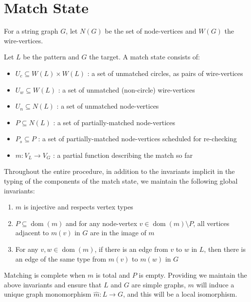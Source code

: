 \documentclass{article}
\DeclareMathOperator{\dom}{dom}
\begin{document}
\section{Match State}
\label{sec:match-state}

For a string graph $G$, let $N(G)$ be the set of node-vertices and $W(G)$ the wire-vertices.

Let $L$ be the pattern and $G$ the target. A match state consists of:

\begin{itemize}
    \item $U_c \subseteq W(L)\times W(L)$ : a set of unmatched circles, as pairs of wire-vertices
    \item $U_w \subseteq W(L)$ : a set of unmatched (non-circle) wire-vertices
    \item $U_n \subseteq N(L)$ : a set of unmatched node-vertices
    \item $P \subseteq N(L)$ : a set of partially-matched node-vertices
    \item $P_s \subseteq P$ : a set of partially-matched node-vertices scheduled for re-checking
    \item $m : V_L \rightarrow V_G$ : a partial function describing the match so far
\end{itemize}

Throughout the entire procedure, in addition to the invariants implicit in the typing of the components of the match state, we maintain the following global invariants:
\begin{enumerate}
  \renewcommand{\theenumi}{(\arabic{enumi})}
  \renewcommand{\labelenumi}{\theenumi}
  \item \label{enum:g-inv-inj} $m$ is injective and respects vertex types
  \item \label{enum:g-inv-local-iso} $P \subseteq \dom(m)$ and for any node-vertex $v \in \dom(m)\setminus P$, all vertices adjacent to $m(v)$ in $G$ are in the image of $m$
  \item \label{enum:g-inv-edge-match} For any $v,w \in \dom(m)$, if there is an edge from $v$ to $w$ in $L$, then there is an edge of the same type from $m(v)$ to $m(w)$ in $G$
\end{enumerate}

Matching is complete when $m$ is total and $P$ is empty.  Providing we maintain the above invariants and ensure that $L$ and $G$ are simple graphs, $m$ will induce a unique graph monomorphism $\hat m:L \rightarrow G$, and this will be a local isomorphism.
\end{document}

